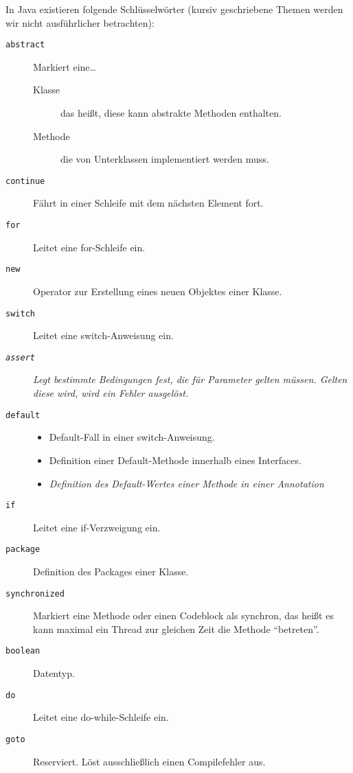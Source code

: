 	In Java existieren folgende Schlüsselwörter (kursiv geschriebene Themen werden wir nicht ausführlicher betrachten):
	\begin{description}
        \item[\texttt{abstract}] Markiert eine\dots
	        \begin{description}
	        	\item[Klasse] das heißt, diese kann abstrakte Methoden enthalten.
	        	\item[Methode] die von Unterklassen implementiert werden muss.
	        \end{description}
        \item[\texttt{continue}] Fährt in einer Schleife mit dem nächsten Element fort.
        \item[\texttt{for}] Leitet eine for-Schleife ein.
        \item[\texttt{new}] Operator zur Erstellung eines neuen Objektes einer Klasse.
        \item[\texttt{switch}] Leitet eine switch-Anweisung ein.
        \item[\textit{\texttt{assert}}] \textit{Legt bestimmte Bedingungen fest, die für Parameter gelten müssen. Gelten diese wird, wird ein Fehler ausgelöst.} 
        \item[\texttt{default}]
	        \begin{itemize}
	        	\item Default-Fall in einer switch-Anweisung.
	        	\item Definition einer Default-Methode innerhalb eines Interfaces.
	        	\item \textit{Definition des Default-Wertes einer Methode in einer Annotation}
	        \end{itemize}
        \item[\texttt{if}] Leitet eine if-Verzweigung ein.
        \item[\texttt{package}] Definition des Packages einer Klasse.
        \item[\texttt{synchronized}] Markiert eine Methode oder einen Codeblock als synchron, das heißt es kann maximal ein Thread zur gleichen Zeit die Methode \enquote{betreten}. 
        \item[\texttt{boolean}] Datentyp.
        \item[\texttt{do}] Leitet eine do-while-Schleife ein.
        \item[\texttt{goto}] Reserviert. Löst ausschließlich einen Compilefehler aus.

\end{description}
